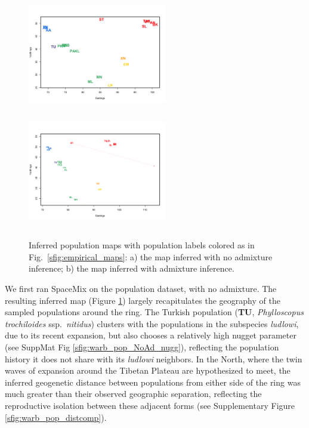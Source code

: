 \documentclass[12pt]{article}
\begin{document}
\begin{figure}
	\centering
			{\includegraphics[width=2.4in,height=2in]{figs/warblers/warb_pop_noad.png}}
			{\includegraphics[width=2.4in,height=2in]{figs/warblers/population_warbler_map_randpr1.png}}
\caption{Inferred population maps with population labels colored as in Fig.\ \ref{sfig:empirical_maps}: a) the map inferred with no admixture inference; b) the map inferred with admixture inference.}
\label{sfig:warbler_pop}
\end{figure}

We first ran SpaceMix on the population dataset, with no admixture. The resulting inferred map (Figure \ref{sfig:warbler_pop}) largely recapitulates the geography of the sampled populations around the ring.  The Turkish population (\textbf{TU}, \textit{Phylloscopus trochiloides} ssp.\ \textit{nitidus}) clusters with the populations in the subspecies \textit{ludlowi}, due to its recent expansion, but also chooses a relatively high nugget parameter (see SuppMat Fig \ref{sfig:warb_pop_NoAd_nugg}), reflecting the population history it does not share with its \textit{ludlowi} neighbors.  In the North, where the twin waves of expansion around the Tibetan Plateau are hypothesized to meet, the inferred geogenetic distance between populations from either side of the ring was much greater than their observed geographic separation, reflecting the reproductive isolation between these adjacent forms (see Supplementary Figure \ref{sfig:warb_pop_distcomp}).  
\end{document}
